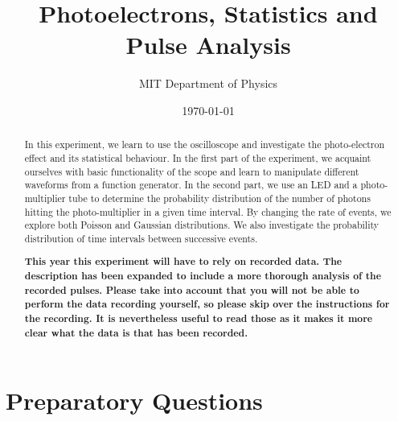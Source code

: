 \documentclass[10pt,aps,twocolumn,secnumarabic,balancelastpage,amsmath,amssymb,nofootinbib,floatfix]{revtex4}
\begin{document}
\title{Photoelectrons, Statistics and Pulse Analysis}
\author{MIT Department of Physics}
\date{\today}

\begin{abstract}
  In this experiment, we learn to use the oscilloscope and investigate the photo-electron effect and its statistical behaviour. In the first part of the experiment, we acquaint ourselves with basic functionality of the scope and learn to manipulate different waveforms from a function generator. In the second part, we use an LED and a photo-multiplier tube to determine the probability distribution of the number of photons hitting the photo-multiplier in a given time interval. By changing the rate of events, we explore both Poisson and Gaussian distributions. We also investigate the probability distribution of time intervals between successive events.

{\bf This year this experiment will have to rely on recorded data. The description has been expanded to include a more thorough analysis of the recorded pulses. Please take into account that you will not be able to perform the data recording yourself, so please skip over the instructions for the recording. It is nevertheless useful to read those as it makes it more clear what the data is that has been recorded.}
\end{abstract}

\maketitle

\section*{Preparatory Questions}
\end{document}
